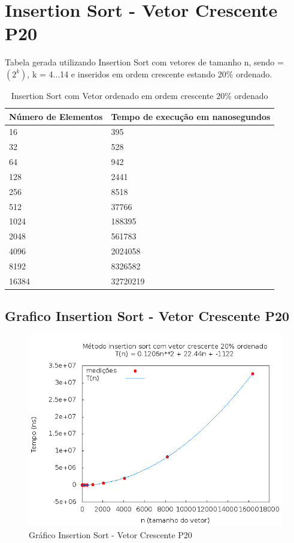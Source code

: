 \documentclass[12pt,a4paper,twoside]{report}
\begin{document}
\section{Insertion Sort - Vetor Crescente P20}
Tabela gerada utilizando Insertion Sort com vetores de tamanho n, sendo = $(2^k)$, k = 4...14 e inseridos em ordem crescente estando 20\% ordenado.

\begin{table}[H]
\centering
\caption{Insertion Sort com Vetor ordenado em ordem crescente 20\% ordenado}
\label{my-label}
\begin{tabular}{|l|l|}
\hline
\multicolumn{1}{|c|}{\textbf{Número de Elementos}} & \multicolumn{1}{c|}{\textbf{Tempo de execução em nanosegundos}} \\ \hline
16 & 395 \\ \hline
32 & 528 \\ \hline
64 & 942 \\ \hline
128 & 2441 \\ \hline
256 & 8518 \\ \hline
512 & 37766 \\ \hline
1024 & 188395 \\ \hline
2048 & 561783 \\ \hline
4096 & 2024058 \\ \hline
8192 & 8326582 \\ \hline
16384 & 32720219 \\ \hline
\end{tabular}
\end{table}

\subsection{Grafico Insertion Sort - Vetor Crescente P20}
\begin{figure}[H]
    \centering
    \includegraphics[width=0.7\linewidth]{graficos/Insertion/vIntCrescenteP20/vIntCrescenteP20.png}
  \caption{Gráfico Insertion Sort - Vetor Crescente P20}
\end{figure}
\end{document}
